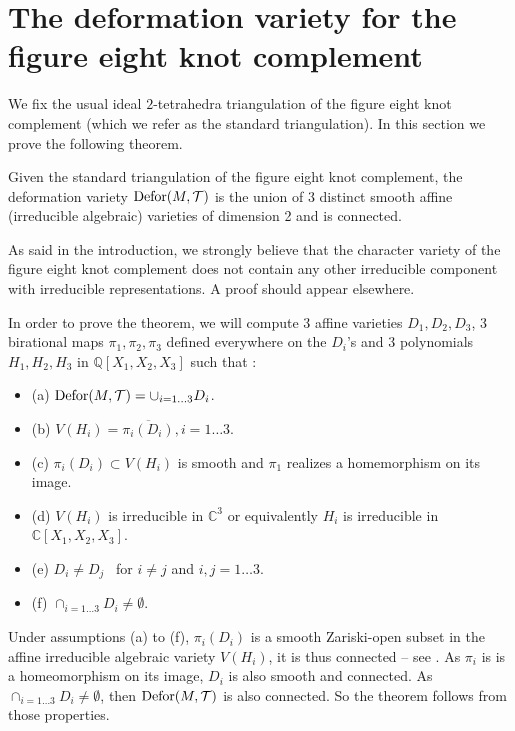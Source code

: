
\section{The deformation variety for the figure eight knot complement}
\label{computations}

We fix the usual ideal $2$-tetrahedra triangulation of the figure eight knot
complement (which we refer as the standard triangulation). In this section we
prove the following theorem.

\begin{theorem}\label{3components}
  Given the standard triangulation of the figure eight knot complement, the
  deformation variety $\operatorname{Defor} ( M, \mathcal{T} )$ is the union of 3
  distinct smooth affine (irreducible algebraic) varieties of dimension 2 and
  is connected.
\end{theorem}

As said in the introduction, we strongly believe that the character variety of the figure 
eight knot complement does not contain any other irreducible component with irreducible 
representations. A proof should appear elsewhere.

In order to prove the theorem, we will compute 3 affine varieties $D_{1}
,D_{2} ,D_{3}$, 3 birational maps $\pi_{1} , \pi_{2} , \pi_{3}$ defined
everywhere on the $D_{i}$'s and $3$ polynomials $H_{1} ,H_{2} ,H_{3}$ in
$\mathbb{Q} [ X_{1} ,X_{2} ,X_{3} ]$ such that :
\begin{itemize}
  \item (a) $\operatorname{Defor} ( M, \mathcal{T} ) = \cup_{i=1 \ldots 3} D_{i}$.
  
  \item (b) $V ( H_{i} ) = \overline{\pi_{i} ( D_{i} )} ,i=1 \ldots 3$.
  
  \item (c) $\pi_{i} ( D_{i} ) \subset V ( H_{i} )$ is smooth and $\pi_1$ realizes a homemorphism on its image.  
  \item (d) $V ( H_{i} )$ is irreducible in $\mathbb{C}^{3}$  or equivalently $H_{i}$ is
  irreducible in $\mathbb{C} [ X_{1} ,X_{2} ,X_{3} ]$.
  
  \item (e) $D_{i} \neq D_{j}$ \ for $i \neq j$ and $i,j=1 \ldots 3$.
    \item (f) $\cap_{i=1 \ldots 3} D_{i} \neq \emptyset$.
\end{itemize}
Under assumptions (a) to (f), $\pi_{i} ( D_{i} )$ is a  smooth Zariski-open subset
in the affine irreducible algebraic variety $V ( H_{i} )$, it is thus
connected -- see \cite[4.16]{Mumford}. As $\pi_{i}$ is  is a homeomorphism on its image, $D_{i}$ is also smooth and
connected. As $\cap_{i=1 \ldots 3} D_{i} \neq \emptyset$, then $\operatorname{Defor}(M,\mathcal T)$
is also connected. So the theorem follows from those properties.

